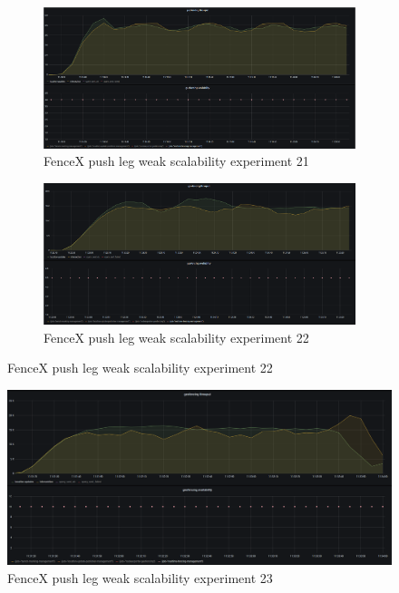 \documentclass[a4]{report}
\begin{document}
    \begin{figure}
        \centering
        \begin{subfigure}[b]{\textwidth}
            \centering
            \caption{FenceX push leg weak scalability experiment 21}
            \label{fig:ex21}
            \includegraphics[width=\textwidth, height=0.35\textheight, scale=2]{images/evaluation/ex21-benchmarking-ongoing-1per6sec.png}
        \end{subfigure}

        \begin{subfigure}[b]{\textwidth}
            \centering
            \caption{FenceX push leg weak scalability experiment 22}
            \label{fig:ex22}
            \includegraphics[width=\textwidth, height=0.35\textheight, scale=2]{images/evaluation/ex22-benchmarking-ongoing-1per2sec.png}
        \end{subfigure}
    \end{figure}

    \begin{figure}
        \caption{FenceX push leg weak scalability experiment 23}
        \label{fig:ex23}
        \includegraphics[width=\textwidth, height=0.35\textheight]{images/evaluation/ex23-benchmarking-ongoing-2per2sec.png}
    \end{figure}
\end{document}
